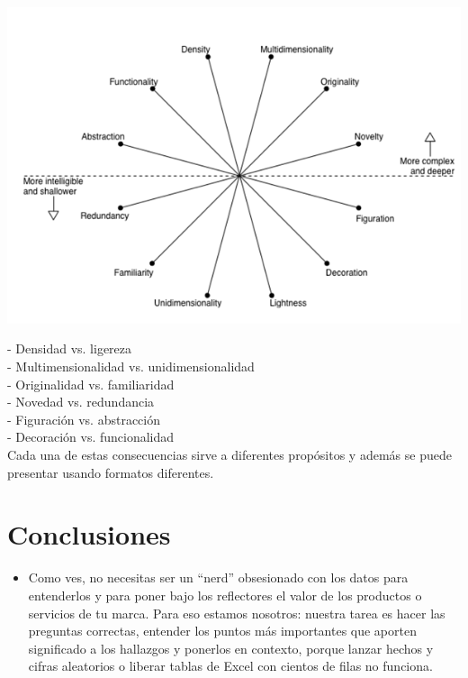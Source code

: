 {{\begin{itemize}
		\begin{center}
		\includegraphics[width=15cm]{./Imagenes/Ejemplo1}
		\end{center}
		
- Densidad vs. ligereza\\
- Multimensionalidad vs. unidimensionalidad\\
- Originalidad vs. familiaridad\\
- Novedad vs. redundancia\\
- Figuración vs. abstracción\\
- Decoración vs. funcionalidad\\

Cada una de estas consecuencias sirve a diferentes propósitos y además se puede presentar usando formatos diferentes.

	\end{itemize}

\section{Conclusiones}

\begin{itemize}
\item Como ves, no necesitas ser un “nerd” obsesionado con los datos para entenderlos y para poner bajo los reflectores el valor de los productos o servicios de tu marca. Para eso estamos nosotros: nuestra tarea es hacer las preguntas correctas, entender los puntos más importantes que aporten significado a los hallazgos y ponerlos en contexto, porque lanzar hechos y cifras aleatorios o liberar tablas de Excel con cientos de filas no funciona. 


\end{itemize}}}
